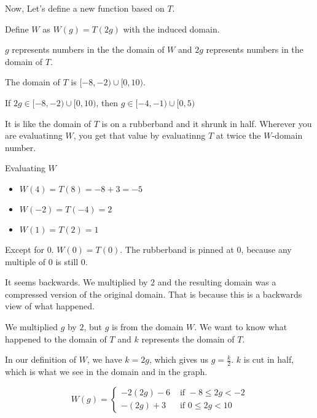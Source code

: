 \documentclass{ximera}
\begin{document}
Now, Let's define a new function based on $T$.



Define $W$ as $W(g) = T(2g)$ with the induced domain.



$g$ represents numbers in the the domain of $W$ and $2g$ represents numbers in the domain of $T$.  

The domain of $T$ is $[-8,-2) \cup [0,10)$.


If $2g \in [-8,-2) \cup [0,10)$, then $g \in [-4,-1) \cup [0,5)$

It is like the domain of $T$ is on a rubberband and it shrunk in half. Wherever you are evaluatinng $W$, you get that value by evaluatinng $T$ at twice the $W$-domain number.



\begin{example}  Evaluating $W$

\begin{itemize}
\item $W(4) = T(8) = -8+3=-5$
\item $W(-2) = T(-4) = 2$
\item $W(1) = T(2) = 1$
\end{itemize}


\end{example}


Except for $0$. $W(0) = T(0)$.  The rubberband is pinned at $0$, because any multiple of $0$ is still $0$.  



It seems backwards.  We multiplied by $2$ and the resulting domain was a compressed version of the original domain.  That is because this is a backwards view of what happened.



We multiplied $g$ by $2$, but $g$ is from the domain $W$.  We want to know what happened to the domain of $T$ and $k$ represents the domain of $T$.

In our definition of $W$, we have $k=2g$, which gives us $g=\frac{k}{2}$.  $k$ is cut in half, which is what we see in the domain and in the graph.




\[
W(g) = 
\begin{cases}
  -2(2g)-6    & \text{ if }  -8 \leq 2g < -2 \\
  -(2g)+3   & \text{ if } 0 \leq 2g < 10
\end{cases}
\]
\end{document}
